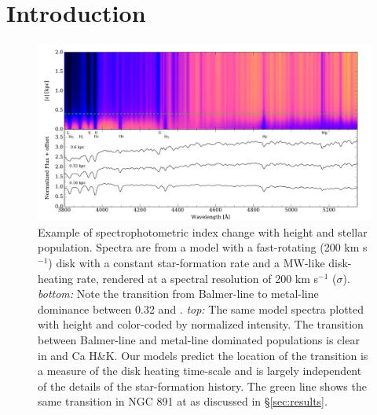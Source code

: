 \section{Introduction}
\label{sec:introduction}

\begin{figure}
  \centering
  \includegraphics[width=\textwidth]{891_1/figs/mab_stack.pdf}
  \caption{\label{fig:MW_heating}\fixspacing Example of
    spectrophotometric index change with height and stellar
    population. Spectra are from a model with a fast-rotating (200 km
    s$^{-1}$) disk with a constant star-formation rate and a MW-like
    disk-heating rate, rendered at a spectral resolution of 200 km
    s$^{-1}$ ($\sigma$).  \emph{bottom:} Note the transition from
    Balmer-line to metal-line dominance between 0.32 and
    . \emph{top:} The same model spectra plotted with
    height and color-coded by normalized intensity. The transition
    between Balmer-line and metal-line dominated populations is clear
    in \Hda and Ca H\&K. Our models predict the location of the
    transition is a measure of the disk heating time-scale and is
    largely independent of the details of the star-formation
    history. The green line shows the same transition in NGC 891 at
     as discussed in \S\ref{sec:results}.}
\end{figure}

